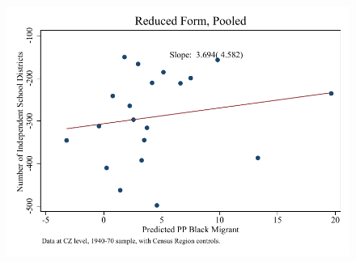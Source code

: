 \documentclass{article}
\begin{document}
\begin{figure}
\centering
\includegraphics{figures/simplefigs/pooled_schdist_ind_raw_C3_rf.pdf}
\end{figure}
\clearpage
\end{document}
